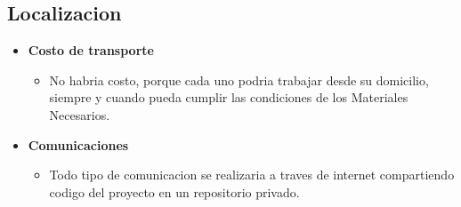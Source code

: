 \documentclass[
10pt, %
a4paper, %
oneside, %
headinclude,footinclude, %
BCOR5mm, %
]{scrartcl}
\begin{document}
\subsection{Localizacion}
\begin{itemize}
  \item \textbf {Costo de transporte}
  \begin{itemize}
    \item No habria costo, porque cada uno podria trabajar
            desde su domicilio, siempre y cuando pueda cumplir
            las condiciones de los Materiales Necesarios.
  \end{itemize}

  \item \textbf {Comunicaciones}
  \begin{itemize}
    \item Todo tipo de comunicacion se realizaria a traves de internet
            compartiendo codigo del proyecto en un repositorio privado.
  \end{itemize}
\end{itemize}
\end{document}
